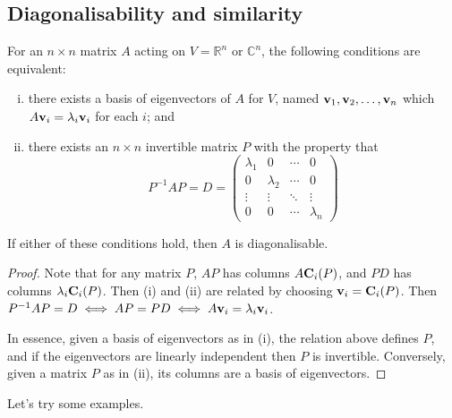 \subsection{Diagonalisability and similarity}
\begin{proposition}
	For an \(n \times n\) matrix \(A\) acting on \(V = \mathbb R^n\) or \(\mathbb C^n\), the following conditions are equivalent:
	\begin{enumerate}[(i)]
		\item there exists a basis of eigenvectors of \(A\) for \(V\), named \(\vb v_1, \vb v_2, \dots, \vb v_n\) which \(A\vb v_i = \lambda_i\vb v_i\) for each \(i\); and
		\item there exists an \(n \times n\) invertible matrix \(P\) with the property that
		      \[
			      P^{-1}AP = D = \begin{pmatrix}
				      \lambda_1 & 0         & \cdots & 0         \\
				      0         & \lambda_2 & \cdots & 0         \\
				      \vdots    & \vdots    & \ddots & \vdots    \\
				      0         & 0         & \cdots & \lambda_n
			      \end{pmatrix}
		      \]
	\end{enumerate}
	If either of these conditions hold, then \(A\) is diagonalisable.
\end{proposition}
\begin{proof}
	Note that for any matrix \(P\), \(AP\) has columns \(A\vb C_i(P)\), and \(PD\) has columns \(\lambda_i \vb C_i(P)\).
	Then (i) and (ii) are related by choosing \(\vb v_i = \vb C_i(P)\).
	Then \(P^{-1}AP = D \iff AP = PD \iff A\vb v_i = \lambda_i\vb v_i\).

	In essence, given a basis of eigenvectors as in (i), the relation above defines \(P\), and if the eigenvectors are linearly independent then \(P\) is invertible.
	Conversely, given a matrix \(P\) as in (ii), its columns are a basis of eigenvectors.
\end{proof}
Let's try some examples.
